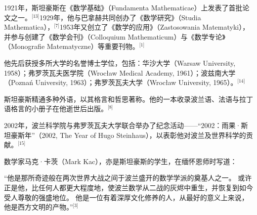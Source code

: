 1921年，斯坦豪斯在《数学基础》（Fundamenta Mathematicae）上发表了首批论文之一。\(^\text{[13]}\)1929年，他与巴拿赫共同创办了《数学研究》（Studia Mathematica），\(^\text{[7]}\)1953年又创立了《数学的应用》（Zastosowania Matematyki），并参与创建了《数学会刊》（Colloquium Mathematicum）与《数学专论》（Monografie Matematyczne）等重要刊物。\(^\text{[1]}\)

他先后获授多所大学的名誉博士学位，包括：华沙大学（Warsaw University, 1958）；弗罗茨瓦夫医学院（Wrocław Medical Academy, 1961）；波兹南大学（Poznań University, 1963）；弗罗茨瓦夫大学（Wrocław University, 1965）。\(^\text{[14]}\)

斯坦豪斯精通多种外语，以其格言和哲思著称。他的一本收录波兰语、法语与拉丁语格言的小册子在他逝世后出版。\(^\text{[8]}\)

2002年，波兰科学院与弗罗茨瓦夫大学联合举办了纪念活动——“2002：雨果·斯坦豪斯年”（2002, The Year of Hugo Steinhaus），以表彰他对波兰及世界科学的贡献。\(^\text{[15]}\)

数学家马克·卡茨（Mark Kac），亦是斯坦豪斯的学生，在缅怀恩师时写道：

“他是那所奇迹般在两次世界大战之间于波兰盛开的数学学派的奠基人之一。  
或许正是他，比任何人都更大程度地，使波兰数学从二战的灰烬中重生，并恢复到如今受人尊敬的强盛地位。  
他是一位有着深厚文化修养的人，从最好的意义上来说，他是西方文明的产物。”\(^\text{[3]}\)

